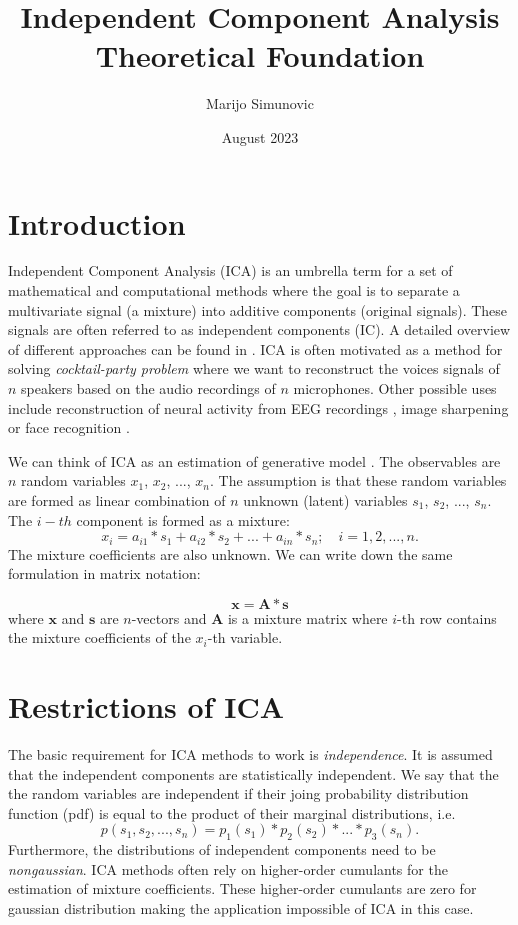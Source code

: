 \documentclass{article}
\title{Independent Component Analysis \\ Theoretical Foundation}
\author{Marijo Simunovic}
\date{August 2023}
\begin{document}
\maketitle

\section{Introduction}

Independent Component Analysis (ICA) is an umbrella term for a set of mathematical and computational methods where the goal is to separate a multivariate signal (a mixture) into additive components (original signals). These signals are often referred to as independent components (IC). A detailed overview of different approaches can be found in \cite{Hyvarinen2001}.
ICA is often motivated as a method for solving \textit{cocktail-party problem} \cite{Brown2001} where we want to reconstruct the voices signals of $n$ speakers based on the audio recordings of $n$ microphones.
Other possible uses include reconstruction of neural activity from EEG recordings \cite{Parker2005}, image sharpening \cite{Kopriva2004} or face recognition \cite{Bartlett2002}.

We can think of ICA as an estimation of generative model \cite{Hyvarinen2000}. The observables are $n$ random variables $x_1$, $x_2$, ..., $x_n$. The assumption is that these random variables are formed as linear combination of $n$ unknown (latent) variables $s_1$, $s_2$, ..., $s_n$. The $i-th$ component is formed as a mixture:
\begin{equation}
x_i = a_{i1} * s_1 + a_{i2} * s_2 + ... + a_{in} * s_n;\quad i=1, 2, ..., n.
\end{equation}
The mixture coefficients are also unknown. We can write down the same formulation in matrix notation:

\begin{equation}
    \textbf{x} = \textbf{A} * \textbf{s}
\end{equation}
where $\textbf{x}$ and $\textbf{s}$ are $n$-vectors and $\textbf{A}$ is a mixture matrix where $i$-th row contains the
mixture coefficients of the $x_i$-th variable.

\section{Restrictions of ICA}
The basic requirement for ICA methods to work is \textit{independence}. It is assumed that the
independent components are statistically independent. We say that the the random variables are
independent if their joing probability distribution function (pdf) is equal to the product of their marginal distributions, i.e.
\begin{equation}
    p(s_1, s_2, ..., s_n) = p_1(s_1) * p_2(s_2) * ... * p_3(s_n) .
\end{equation}
Furthermore, the distributions of independent components need to be \textit{nongaussian}. ICA methods often rely on higher-order cumulants for the estimation of mixture coefficients. These
higher-order cumulants are zero for gaussian distribution making the application impossible of ICA in this case.
\end{document}
